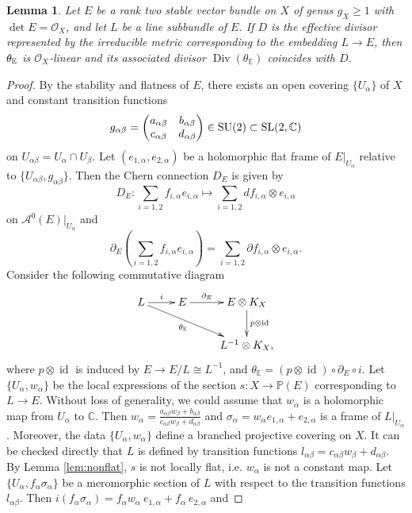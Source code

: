 \documentclass[12pt]{article}
\newtheorem{lem}{Lemma}[section]
\begin{document}
\begin{lem}
\label{lem:flatcase}
Let $E$ be a rank two stable vector bundle on $X$ of genus $g_{X} \geq 1$ with $\det E = \mathcal O_{X}$, and let $L$ be a line subbundle of $E$. If $D$ is the effective divisor represented by the irreducible metric corresponding to the embedding $L \to E$, then $\theta_{\Bbb E}$ is ${\mathcal O}_X$-linear and its associated divisor $\operatorname{Div}(\theta_{\mathbb E})$ coincides with $D$.
\end{lem}
\begin{proof}
By the stability and flatness of $E$, there exists an open covering $\{ U_{\alpha} \}$ of $X$ and constant transition functions
\[ g_{\alpha \beta} = \begin{pmatrix}
a_{\alpha \beta} & b_{\alpha \beta} \\
c_{\alpha \beta} & d_{\alpha \beta}
\end{pmatrix} \in {\rm SU}(2) \subset {\rm SL}(2, \mathbb C) \]
on $U_{\alpha\beta} = U_{\alpha} \cap U_{\beta}$. Let $(e_{1, \alpha}, e_{2, \alpha})$ be a holomorphic flat frame of $E|_{U_{\alpha}}$ relative to $\{ U_{\alpha \beta}, g_{\alpha \beta}\}$. Then the Chern connection $D_{E}$ is given by
\[ D_{E} \colon \sum_{i=1,2} f_{i, \alpha} e_{i, \alpha} \mapsto \sum_{i=1,2} d f_{i, \alpha} \otimes e_{i, \alpha} \]
on $\mathcal{A}^{0}(E)|_{U_{\alpha}}$ and
\[ \partial_{E} \left(\sum_{i=1,2} f_{i, \alpha} e_{i, \alpha} \right) = \sum_{i=1,2} \partial f_{i, \alpha} \otimes e_{i, \alpha}. \]
Consider the following commutative diagram
\begin{equation}
\label{equ:initialcase}
\begin{split} \xymatrix{
 L\ar[r] ^-{i}\ar[drr]_-{\theta_{\mathbb E}} & E\ar[r] ^-{\partial_{E}} & E\otimes K_{X}\ar[d]^-{p \otimes \operatorname{id}} \\
           & & L^{-1}\otimes K_{X},
} \end{split}\end{equation}
where $p \otimes \operatorname{id}$ is induced by $E \rightarrow E/L \cong L^{-1}$, and $\theta_{\mathbb E} = (p\otimes \operatorname{id}) \circ \partial_{E} \circ i$. Let $\{ U_{\alpha}, w_{\alpha} \}$ be the local expressions of the section $s \colon X \to \mathbb P(E)$ corresponding to $L \to E$. Without loss of generality, we could assume that $w_{\alpha}$ is a holomorphic map from $U_{\alpha}$ to $\mathbb{C}$. Then $w_{\alpha} = \frac{a_{\alpha \beta}w_{\beta} + b_{\alpha \beta}}{c_{\alpha \beta}w_{\beta} + d_{\alpha \beta}}$ and $\sigma_{\alpha} = w_{\alpha}e_{1, \alpha} + e_{2, \alpha}$ is a frame of $L|_{U_{\alpha}}$. Moreover, the data $\{ U_{\alpha}, w_{\alpha} \}$ define a branched projective covering on $X$. It can be checked directly that $L$ is defined by transition functions $l_{\alpha \beta} = c_{\alpha \beta} w_{\beta} + d_{\alpha \beta}$. By Lemma \ref{lem:nonflat}, $s$ is not locally flat, i.e. $w_{\alpha}$ is not a constant map. Let $\{ U_{\alpha}, f_{\alpha}\sigma_{\alpha} \}$ be a meromorphic section of $L$ with respect to the transition functions $l_{\alpha \beta}$. Then $i (f_{\alpha} \sigma_{\alpha}) = f_{\alpha}w_{\alpha}\ e_{1, \alpha} + f_{\alpha} \ e_{2, \alpha}$ and

\end{proof}
\end{document}
